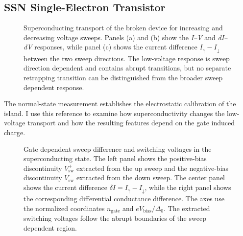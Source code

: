         \subsection*{SSN Single-Electron Transistor}

            \begin{figure}
                \centering
                \caption{
                    Superconducting transport of the broken device for increasing and decreasing voltage sweeps. Panels (a) and (b) show the \textit{I--V} and \textit{dI--dV} responses, while panel (c) shows the current difference $I_\uparrow-I_\downarrow$ between the two sweep directions. The low-voltage response is sweep direction dependent and contains abrupt transitions, but no separate retrapping transition can be distinguished from the broader sweep dependent response.
                }
                \label{fig:ssn1-set:ssn-iv}
            \end{figure}
            
            The normal-state measurement establishes the electrostatic calibration of the island. I use this reference to examine how superconductivity changes the low-voltage transport and how the resulting features depend on the gate induced charge.

            \begin{figure}[t]
                \centering
                \caption{
                    Gate dependent sweep difference and switching voltages in the superconducting state. The left panel shows the positive-bias discontinuity $V_\mathrm{sw}^{+}$ extracted from the up sweep and the negative-bias discontinuity $V_\mathrm{sw}^{-}$ extracted from the down sweep. The center panel shows the current difference $\delta I=I_\uparrow-I_\downarrow$, while the right panel shows the corresponding differential conductance difference. The axes use the normalized coordinates $n_\mathrm{gate}$ and $eV_\mathrm{bias}/\Delta_0$. The extracted switching voltages follow the abrupt boundaries of the sweep dependent region.
                }
                \label{fig:ssn1-set:dGdiff}
            \end{figure}

